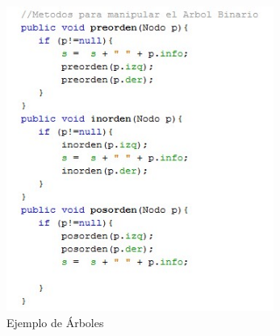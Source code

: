 \documentclass{article}
\begin{document}
\begin{figure}[ht]
    \centering     
    \includegraphics[height=10cm]{images/figura9.jpg}
    \caption{Ejemplo de Árboles}
    \label{fig:BiasVoltager}
    
\end{figure}
\end{document}
